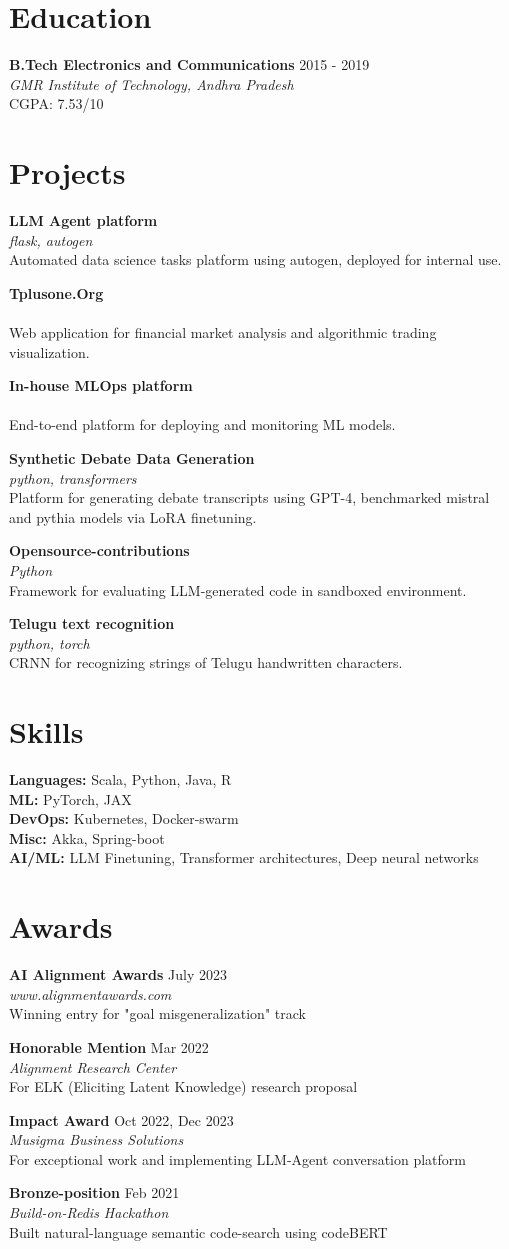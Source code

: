 \documentclass[10pt,letterpaper]{article}
\newcommand{\entry}[4]{
    \textbf{#1} \hfill #2 \\
    \textit{#3} \\
    #4
    \vspace{0.3em}
}
\begin{document}
\begin{multicols}{2}
\section{Education}
\entry{B.Tech Electronics and Communications}{2015 - 2019}{GMR Institute of Technology, Andhra Pradesh}{CGPA: 7.53/10}

\section{Projects}
\entry{LLM Agent platform}{}{flask, autogen}{
    Automated data science tasks platform using autogen, deployed for internal use.
}

\entry{Tplusone.Org}{}{}{
    Web application for financial market analysis and algorithmic trading visualization.
}

\entry{In-house MLOps platform}{}{}{
    End-to-end platform for deploying and monitoring ML models.
}

\columnbreak

\entry{Synthetic Debate Data Generation}{}{python, transformers}{
    Platform for generating debate transcripts using GPT-4, benchmarked mistral and pythia models via LoRA finetuning.
}

\entry{Opensource-contributions}{}{Python}{
    Framework for evaluating LLM-generated code in sandboxed environment.
}

\entry{Telugu text recognition}{}{python, torch}{
    CRNN for recognizing strings of Telugu handwritten characters.
}

\section{Skills}
\textbf{Languages:} Scala, Python, Java, R \\
\textbf{ML:} PyTorch, JAX \\
\textbf{DevOps:} Kubernetes, Docker-swarm \\
\textbf{Misc:} Akka, Spring-boot \\
\textbf{AI/ML:} LLM Finetuning, Transformer architectures, Deep neural networks

\section{Awards}
\entry{AI Alignment Awards}{July 2023}{www.alignmentawards.com}{
    Winning entry for "goal misgeneralization" track
}

\entry{Honorable Mention}{Mar 2022}{Alignment Research Center}{
    For ELK (Eliciting Latent Knowledge) research proposal
}

\entry{Impact Award}{Oct 2022, Dec 2023}{Musigma Business Solutions}{
    For exceptional work and implementing LLM-Agent conversation platform
}

\entry{Bronze-position}{Feb 2021}{Build-on-Redis Hackathon}{
    Built natural-language semantic code-search using codeBERT
}

\end{multicols}
\end{document}
